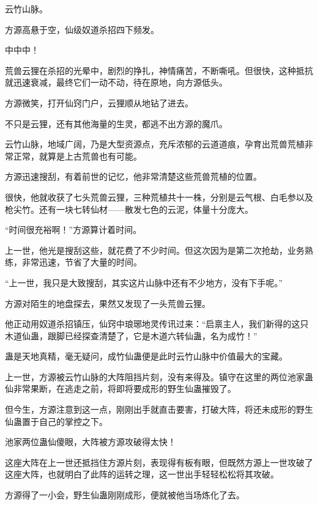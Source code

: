 
\begin{this_body}



云竹山脉。

方源高悬于空，仙级奴道杀招四下频发。

中中中！

荒兽云狸在杀招的光晕中，剧烈的挣扎，神情痛苦，不断嘶吼。但很快，这种抵抗就迅速衰减，最终它们一动不动，待在原地，向方源低头。

方源微笑，打开仙窍门户，云狸顺从地钻了进去。

不只是云狸，还有其他海量的生灵，都逃不出方源的魔爪。

云竹山脉，地域广阔，乃是大型资源点，充斥浓郁的云道道痕，孕育出荒兽荒植非常正常，就算是上古荒兽也有可能。

方源迅速搜刮，有着前世的记忆，他非常清楚这些荒兽荒植的位置。

很快，他就收获了七头荒兽云狸，三种荒植共十一株，分别是云气根、白毛参以及枪尖竹。还有一块七转仙材——散发七色的云泥，体量十分庞大。

“时间很充裕啊！”方源算计着时间。

上一世，他光是搜刮这些，就花费了不少时间。但这次因为是第二次抢劫，业务熟练，非常迅速，节省了大量的时间。

“上一世，我只是大致搜刮，其实这片山脉中还有不少地方，没有下手呢。”

方源对陌生的地盘探去，果然又发现了一头荒兽云狸。

他正动用奴道杀招镇压，仙窍中琅琊地灵传讯过来：“启禀主人，我们新得的这只木道仙蛊，跟脚已经探查清楚了，它是木道六转仙蛊，名为成竹！”

蛊是天地真精，毫无疑问，成竹仙蛊便是此时云竹山脉中价值最大的宝藏。

上一世，方源被云竹山脉的大阵阻挡片刻，没有来得及。镇守在这里的两位池家蛊仙非常果断，在逃走之前，将即将要成形的野生仙蛊摧毁了。

但今生，方源注意到这一点，刚刚出手就直击要害，打破大阵，将还未成形的野生仙蛊置于自己的掌控之下。

池家两位蛊仙傻眼，大阵被方源攻破得太快！

这座大阵在上一世还抵挡住方源片刻，表现得有板有眼，但既然方源上一世攻破了这座大阵，也就明白了此阵的运转之理，这一世出手轻轻松松将其攻破。

方源得了一小会，野生仙蛊刚刚成形，便就被他当场炼化了去。


\end{this_body}
